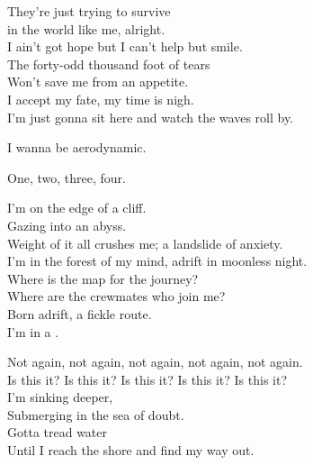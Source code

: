 They're just trying to survive \\
in the world like me, alright. \\
I ain't got hope but I can't help but smile. \\
The forty-odd thousand foot of tears \\
Won't save me from an appetite. \\
I accept my fate, my time is nigh. \\
I'm just gonna sit here and watch the waves roll by. \\


I wanna be aerodynamic. \\





One, two, three, four. \\


I'm on the edge of a cliff. \\
Gazing into an abyss. \\
Weight of it all crushes me; a landslide of anxiety. \\
I'm in the forest of my mind, adrift in moonless night. \\
Where is the map for the journey? \\
Where are the crewmates who join me? \\
Born adrift, a fickle route. \\
I'm in a . \\


Not again, not again, not again, not again, not again. \\
Is this it? Is this it? Is this it? Is this it? Is this it? \\

I'm sinking deeper, \\
Submerging in the sea of doubt. \\
Gotta tread water \\
Until I reach the shore and find my way out. \\

